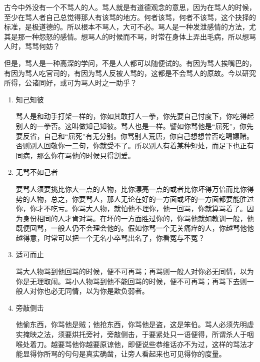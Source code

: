
\hspace{2em}古今中外没有一个不骂人的人。骂人就是有道德观念的意思，因为在骂人的时候，至少在骂人者自己总觉得那人有该骂的地方。何者该骂，何者不该骂，这个抉择的标准，是极道德的。所以根本不骂人，大可不必。骂人是一种发泄感情的方法，尤其是那一种怨怒的感情。想骂人的时候而不骂，时常在身体上弄出毛病，所以想骂人时，骂骂何妨？

\hspace{2em}但是，骂人是一种高深的学问，不是人人都可以随便试的。有因为骂人挨嘴巴的，有因为骂人吃官司的，有因为骂人反被人骂的，这都是不会骂人的原故。今以研究所得，公诸同好，或可为骂人时之一助乎？

\begin{enumerate}

\item 知己知彼

\hspace{1.8em}骂人是和动手打架一样的，你如其敢打人一拳，你先要自己忖度下，你吃得起别人的一拳否。这叫做知己知彼。骂人也是一样。譬如你骂他是“屈死”，你先要反省，自己和“屈死”有无分别。你骂别人荒唐，你自己想想曾否吃喝嫖赌。否则别人回敬你一二句，你就受不了。所以别人有着某种短处，而足下也正有同病，那么你在骂他的时候只得割爱。

\item 无骂不如己者

\hspace{1.8em}要骂人须要挑比你大一点的人物，比你漂亮一点的或者比你坏得万倍而比你得势的人物，总之，你要骂人，那人无论在好的一方面或坏的一方面都要能胜过你，你才不吃亏。你骂大人物，就怕他不理你，他一回骂，你就算骂着了。因为身份相同的人才肯对骂。在坏的一方面胜过你的，你骂他就如教训一般，他既便回骂，一般人仍不会理会他的。假如你骂一个无关痛痒的人，你越骂他他越得意，时常可以把一个无名小卒骂出名了，你看冤与不冤？

\item 适可而止

\hspace{1.8em}骂大人物骂到他回骂的时候，便不可再骂；再骂则一般人对你必无同情，以为你是无理取闹。骂小人物骂到他不能回骂的时候，便不可再骂；再骂下去则一般人对你也必无同情，以为你是欺负弱者。

\item 旁敲侧击

\hspace{1.8em}他偷东西，你骂他是贼；他抢东西，你骂他是盗，这是笨伯。骂人必须先明虚实掩映之法，须要烘托旁衬，旁敲侧击，于要紧处只一语便得，所谓杀人于咽喉处着刀。越要骂他你越要原谅他，即便说些恭维话亦不为过，这样的骂法才能显得你所骂的句句是真实确凿，让旁人看起来也可见得你的度量。


\end{enumerate}
